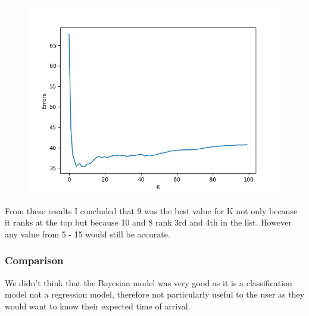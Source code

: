 \documentclass[11pt]{article}
\begin{document}
	\begin{figure}[!htb]
		\centering
		\begin{minipage}{.8\textwidth}
			\centering
			\includegraphics[width=.8\linewidth]{Resources/PartTwo/searchingForK_20220110_065714.png}
			\label{Img:KSearch}
		\end{minipage}%
		\begin{minipage}{.2\textwidth}
			\centering
			\label{Img:KSearchRaw}
		\end{minipage}
	\end{figure}

	From these results I concluded that 9 was the best value for K not only because it ranks at the top but because 10 and 8 rank 3rd and 4th in the list. However any value from 5 - 15 would still be accurate.
	\subsubsection{Comparison}
	We didn't think that the Bayesian model was very good as it is a classification model not a regression model, therefore not particularly useful to the user as they would want to know their expected time of arrival.
	
\end{document}
